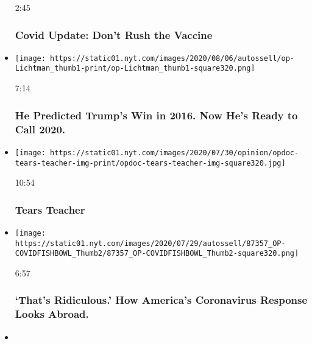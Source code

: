 \begin{itemize}
  2:45

  \hypertarget{covid-update-dont-rush-the-vaccine}{%
  \subsubsection{Covid Update: Don't Rush the
  Vaccine}\label{covid-update-dont-rush-the-vaccine}}
\item
  \href{https://www.nytimes.com/video/opinion/100000007227782/2020-election-prediction-allan-lichtman.html?action=click\&module=video-series-bar\&region=header\&pgtype=Article\&playlistId=video/opinion}{}

  \texttt{[image: https://static01.nyt.com/images/2020/08/06/autossell/op-Lichtman\_thumb1-print/op-Lichtman\_thumb1-square320.png]}

  7:14

  \hypertarget{he-predicted-trumps-win-in-2016-now-hes-ready-to-call-2020}{%
  \subsubsection{He Predicted Trump's Win in 2016. Now He's Ready to
  Call
  2020.}\label{he-predicted-trumps-win-in-2016-now-hes-ready-to-call-2020}}
\item
  \href{https://www.nytimes.com/video/opinion/100000007247238/tears-teacher.html?action=click\&module=video-series-bar\&region=header\&pgtype=Article\&playlistId=video/opinion}{}

  \texttt{[image: https://static01.nyt.com/images/2020/07/30/opinion/opdoc-tears-teacher-img-print/opdoc-tears-teacher-img-square320.jpg]}

  10:54

  \hypertarget{tears-teacher}{%
  \subsubsection{Tears Teacher}\label{tears-teacher}}
\item
  \href{https://www.nytimes.com/video/opinion/100000007227777/covid-19-global-response.html?action=click\&module=video-series-bar\&region=header\&pgtype=Article\&playlistId=video/opinion}{}

  \texttt{[image: https://static01.nyt.com/images/2020/07/29/autossell/87357\_OP-COVIDFISHBOWL\_Thumb2/87357\_OP-COVIDFISHBOWL\_Thumb2-square320.png]}

  6:57

  \hypertarget{thats-ridiculous-how-americas-coronavirus-response-looks-abroad}{%
  \subsubsection{`That's Ridiculous.' How America's Coronavirus Response
  Looks
  Abroad.}\label{thats-ridiculous-how-americas-coronavirus-response-looks-abroad}}
\item
  \href{https://www.nytimes.com/video/opinion/100000007229285/the-lonely-goalkeeper.html?action=click\&module=video-series-bar\&region=header\&pgtype=Article\&playlistId=video/opinion}{}


\end{itemize}
